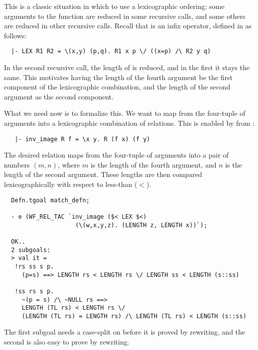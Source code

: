 This is a classic situation in which to use a lexicographic ordering:
some arguments to the function are reduced in some recursive calls, and
some others are reduced in other recursive calls.  Recall that  is
an infix operator, defined in  as follows:
%
\begin{hol}
\begin{verbatim}
  |- LEX R1 R2 = \(x,y) (p,q). R1 x p \/ ((x=p) /\ R2 y q)
\end{verbatim}
\end{hol}
%
In the second recursive call, the length of  is reduced, and in
the first it stays the same. This motivates having the length of the
fourth argument be the first component of the lexicographic
combination, and the length of the second argument as the second
component.

What we need now is to formalize this. We want to map from the
four-tuple of arguments into a lexicographic combination of
relations. This is enabled by  from :
%
\begin{hol}
\begin{verbatim}
   |- inv_image R f = \x y. R (f x) (f y)
\end{verbatim}
\end{hol}
%
The desired relation maps from the four-tuple of arguments into a pair
of numbers $(m,n)$, where $m$ is the length of the fourth argument, and
$n$ is the length of the second argument. These lengths are then
compared lexicographically with respect to less-than ($<$).
\begin{session}
\begin{hol}
\begin{verbatim}
  Defn.tgoal match_defn;

  - e (WF_REL_TAC `inv_image ($< LEX $<)
                    (\(w,x,y,z). (LENGTH z, LENGTH x))`);

  OK..
  2 subgoals:
  > val it =
   !rs ss s p. 
     (p=s) ==> LENGTH rs < LENGTH rs \/ LENGTH ss < LENGTH (s::ss)
    
   !ss rs s p.
     ~(p = s) /\ ~NULL rs ==>
     LENGTH (TL rs) < LENGTH rs \/
     (LENGTH (TL rs) = LENGTH rs) /\ LENGTH (TL rs) < LENGTH (s::ss)
\end{verbatim}
\end{hol}
\end{session}
%
The first subgoal needs a case-split on  before it is proved by
rewriting, and the second is also easy to prove by rewriting.

